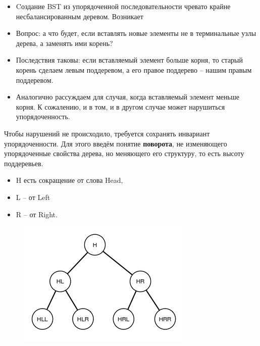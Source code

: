 \documentclass{beamer}
\begin{document}
\begin{frame}[fragile]
	\begin{itemize}
		\item Cоздание BST из упорядоченной последовательности чревато крайне несбалансированным деревом. Возникает 		\item Вопрос: а что будет, если вставлять новые элементы не в терминальные узлы дерева, а заменять ими корень?
		\item Последствия таковы: если вставляемый элемент больше корня, то старый корень сделаем левым поддеревом, а его правое поддерево -- нашим правым поддеревом. 
		\item Аналогично рассуждаем для случая, когда вставляемый элемент меньше корня. К сожалению, и в том, и в другом случае может нарушиться упорядоченность. 
	\end{itemize}
\end{frame}

\begin{frame}[fragile]
	Чтобы нарушений не происходило, требуется сохранять инвариант упорядоченности. Для этого введём понятие \textbf{поворота}, не изменяющего упорядоченные свойства дерева, но меняющего его структуру, то есть высоту поддеревьев.
	\begin{itemize}
		\item H есть сокращение от слова Head, 
		\item L -- от Left 
		\item R -- от Right.
	\end{itemize}
	\begin{figure}[h]
		\centering
		\includegraphics[scale=0.75]{images/lec07-pic12.png}
	\end{figure}
\end{frame}
\end{document}
